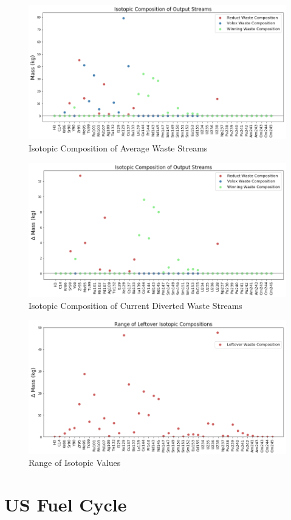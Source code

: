 \begin{figure}
	\centering
	\includegraphics[width=\linewidth]{images/avg-isotope-comp}
	\caption{Isotopic Composition of Average Waste Streams}
	\label{fig:avg-isotope-comp}
\end{figure}

\begin{figure}
	\centering
	\includegraphics[width=\linewidth]{images/current-isotope-comp}
	\caption{Isotopic Composition of Current Diverted Waste Streams}
	\label{fig:current-isotope-comp}
\end{figure}

\begin{figure}
	\centering
	\includegraphics[width=\linewidth]{images/isotopic-comp-range}
	\caption{Range of Isotopic Values}
	\label{fig:isotopic-range}
\end{figure}

\section{US Fuel Cycle}